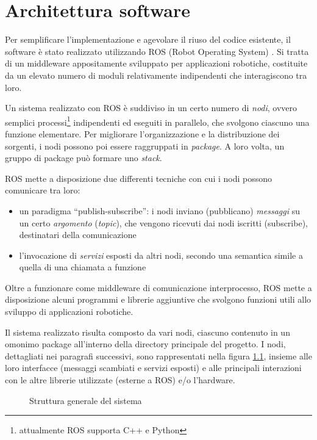\chapter{Architettura software}
\label{cap:architetturasw}

Per semplificare l'implementazione e agevolare il riuso del codice esistente, il software è stato realizzato utilizzando ROS (Robot Operating System) \cite{rosweb}. Si tratta di un middleware appositamente sviluppato per applicazioni robotiche, costituite da un elevato numero di moduli relativamente indipendenti che interagiscono tra loro.

Un sistema realizzato con ROS è suddiviso in un certo numero di \emph{nodi}, ovvero semplici processi\footnote{attualmente ROS supporta C++ e Python} indipendenti ed eseguiti in parallelo, che svolgono ciascuno una funzione elementare. Per migliorare l'organizzazione e la distribuzione dei sorgenti, i nodi possono poi essere raggruppati in \emph{package}. A loro volta, un gruppo di package può formare uno \emph{stack}.

ROS mette a disposizione due differenti tecniche con cui i nodi possono comunicare tra loro:
\begin{itemize}
 \item un paradigma ``publish-subscribe'': i nodi inviano (pubblicano) \emph{messaggi} su un certo \emph{argomento} (\emph{topic}), che vengono ricevuti dai nodi iscritti (subscribe), destinatari della comunicazione
 \item l'invocazione di \emph{servizi} esposti da altri nodi, secondo una semantica simile a quella di una chiamata a funzione
\end{itemize}

Oltre a funzionare come middleware di comunicazione interprocesso, ROS mette a disposizione alcuni programmi e librerie aggiuntive che svolgono funzioni utili allo sviluppo di applicazioni robotiche.

Il sistema realizzato risulta composto da vari nodi, ciascuno contenuto in un omonimo package all'interno della directory principale del progetto. I nodi, dettagliati nei paragrafi successivi, sono rappresentati nella figura \ref{fig:schemanodi}, insieme alle loro interfacce (messaggi scambiati e servizi esposti) e alle principali interazioni con le altre librerie utilizzate (esterne a ROS) e/o l'hardware.

\begin{figure}[h]

\caption{Struttura generale del sistema} 
\label{fig:schemanodi}
\end{figure}


